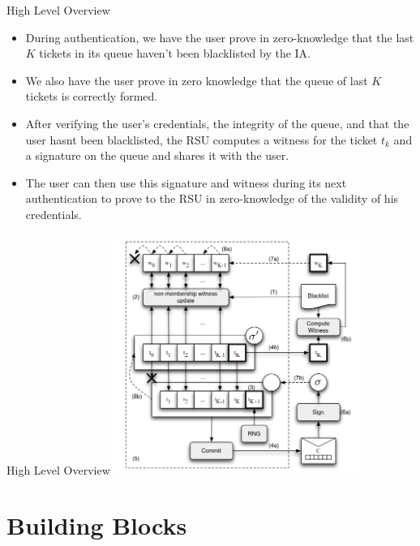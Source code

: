 \documentclass[
	xcolor={svgnames},
	hyperref={pagebackref,bookmarks},
	aspectratio=43,
]{beamer}
\begin{document}
\begin{frame}{High Level Overview}
	\begin{itemize}
		\item<alert@+> During authentication, we have the user prove in zero-knowledge that the last $K$ tickets in its queue haven't been blacklisted by the IA.
		\item<alert@+> We also have the user prove in zero knowledge that the queue of last $K$ tickets is correctly formed.
		\item<alert@+> After verifying the user's credentials, the integrity of the queue, and that the user hasnt been blacklisted, the RSU computes a witness for the ticket $t_k$ and a signature on the queue and shares it with the user.
		\item<alert@+> The user can then use this signature and witness during its next authentication to prove to the RSU in zero-knowledge of the validity of his credentials.
	\end{itemize}
\end{frame}

\begin{frame}{High Level Overview}
	\centering
	\includegraphics[width=0.6\textwidth]{images/modified-scheme.png}
\end{frame}
			

\section{Building Blocks}
\end{document}
